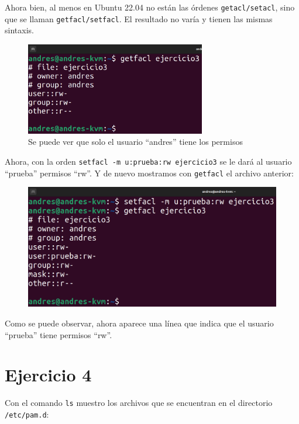 \documentclass{article}
\begin{document}
Ahora bien, al menos en Ubuntu 22.04 no están las órdenes \verb|getacl/setacl|, sino que se llaman \verb|getfacl/setfacl|. El resultado no varía y tienen las mismas sintaxis.

\begin{figure}[H]
    \centering
    \includegraphics[width=0.7\textwidth]{imagenes/getfaclorg.png}
    \caption{Se puede ver que solo el usuario ``andres'' tiene los permisos}
\end{figure}


Ahora, con la orden \verb|setfacl -m u:prueba:rw ejercicio3| se le dará al usuario ``prueba'' permisos ``rw''. Y de nuevo mostramos con \verb|getfacl| el archivo anterior:

\begin{figure}[H]
    \centering
    \includegraphics[width=\textwidth]{imagenes/getfaclnew.png}
\end{figure}

Como se puede observar, ahora aparece una línea que indica que el usuario ``prueba'' tiene permisos ``rw''.


\section*{Ejercicio 4}
Con el comando \verb|ls| muestro los archivos que se encuentran en el directorio \verb|/etc/pam.d|:
\end{document}
